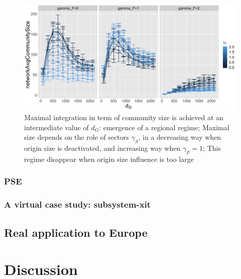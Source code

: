 \documentclass{article}
\begin{document}
\begin{figure}
    \includegraphics[height=0.6\textheight]{figures/networkAvgCommunitySize_countryGravityDecay2100_gammaDestination0_facetwrapgammaOrigin_colorgammaSectors.png}
	\caption{Maximal integration in term of community size is achieved at an intermediate value of $d_G$: emergence of a regional regime; Maximal size depends on the role of sectors $\gamma_S$, in a decreasing way when origin size is deactivated, and increasing way when $\gamma_F=1$; This regime disappear when origin size influence is too large}
\end{figure}


\subsubsection{PSE}


\subsubsection{A virtual case study: subsystem-xit}



\subsection{Real application to Europe}





\section{Discussion}








\end{document}
